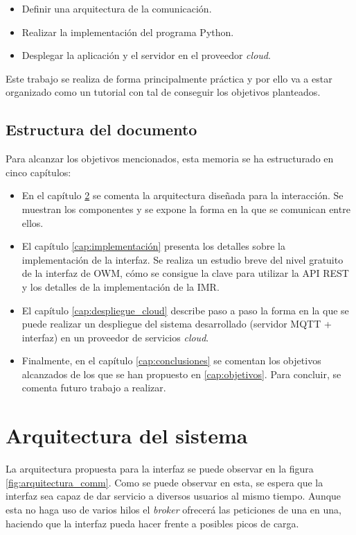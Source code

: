 \documentclass{scrbook}
\begin{document}
\begin{itemize}
    \item Definir una arquitectura de la comunicación.
    \item Realizar la implementación del programa Python.
    \item Desplegar la aplicación y el servidor en el proveedor \textit{cloud}.
\end{itemize}

Este trabajo se realiza de forma principalmente práctica y por ello va a estar organizado como un tutorial con tal de conseguir los objetivos planteados.

\section{Estructura del documento}
Para alcanzar los objetivos mencionados, esta memoria se ha estructurado en cinco capítulos:

\begin{itemize}
    \item En el capítulo \ref{cap:arquitectura} se comenta la arquitectura diseñada para la interacción. Se muestran los componentes y se expone la forma en la que se comunican entre ellos. 
    \item El capítulo \ref{cap:implementación} presenta los detalles sobre la implementación de la interfaz. Se realiza un estudio breve del nivel gratuito de la interfaz de OWM, cómo se consigue la clave para utilizar la API REST y los detalles de la implementación de la IMR.
    \item El capítulo \ref{cap:despliegue_cloud} describe paso a paso la forma en la que se puede realizar un despliegue del sistema desarrollado (servidor MQTT + interfaz) en un proveedor de servicios \textit{cloud}.
    \item Finalmente, en el capítulo \ref{cap:conclusiones} se comentan los objetivos alcanzados de los que se han propuesto en \ref{cap:objetivos}. Para concluir, se comenta futuro trabajo a realizar.
\end{itemize}

\chapter{Arquitectura del sistema}
\label{cap:arquitectura}

La arquitectura propuesta para la interfaz se puede observar en la figura \ref{fig:arquitectura_comm}. Como se puede observar en esta, se espera que la interfaz sea capaz de dar servicio a diversos usuarios al mismo tiempo. Aunque esta no haga uso de varios hilos el \textit{broker} ofrecerá las peticiones de una en una, haciendo que la interfaz pueda hacer frente a posibles picos de carga.
\end{document}
